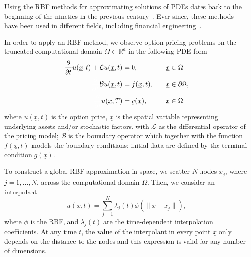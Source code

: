 \documentclass{UUThesisTemplate}
\begin{document}
\par
Using the RBF methods for approximating solutions of PDEs dates back to the beginning of the nineties in the previous century~\cite{kansa1990multiquadrics1,kansa1990multiquadrics2}. Ever since, these methods have been used in different fields, including financial engineering~\cite{hon1999radial, fasshauer2004using,pettersson2008improved}. 

\par
In order to apply an RBF method, we observe option pricing problems on the truncated computational domain $\Omega\subset \mathbb{R}^{d}$ in the following PDE form
\begin{alignat}{2}
\frac{\partial}{\partial t}u(\underline{x},t) + \mathcal{L}u(\underline{x},t) &= 0, \quad &&\underline{x} \in \Omega \label{eqPDE} \\
{\color{white} \frac{\partial}{\partial t}} \mathcal{B}u(\underline{x},t) &= f(\underline{x},t), \quad &&\underline{x} \in \partial \Omega, \label{eqBC} \\
{\color{white} \frac{\partial}{\partial t}} u(\underline{x},T) &= g(\underline{x}), \quad &&\underline{x} \in \Omega, \label{eqTC}
\end{alignat}
where $u(\underline{x},t)$ is the option price, $\underline{x}$ is the spatial variable representing underlying assets and/or stochastic factors, with $\mathcal{L}$ as the differential operator of the pricing model; $\mathcal{B}$ is the boundary operator which together with the function $f(\underline{x},t)$ models the boundary conditions; initial data are defined by the terminal condition $g(\underline{x})$. 

\par
To construct a global RBF approximation in space, we scatter $N$ nodes $\underline{x}_j$, where $j=1,\ldots,N$, across the computational domain $\Omega$. Then, we consider an interpolant
\begin{equation}
\label{eq:RBFint}
	\tilde{u}(\underline{x},t) = \sum_{j=1}^N \lambda_j(t) \phi(\|\underline{x}-\underline{x}_j\|),
\end{equation}
where $\phi$ is the RBF, and $\lambda_j(t)$ are the time-dependent interpolation coefficients. At any time $t$, the value of the interpolant in every point $\underline{x}$ only depends on the distance to the nodes and this expression is valid for any number of dimensions. 
\end{document}
